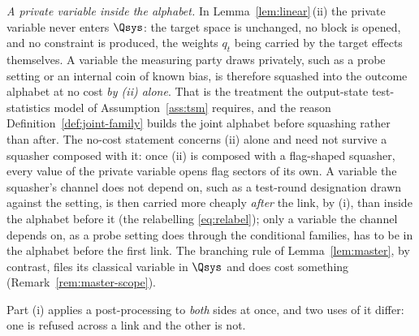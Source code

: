 \begin{remark}\label{rem:intertwining}
\emph{A private variable inside the alphabet.} In
Lemma~\ref{lem:linear}\,(ii) the private variable never enters $\Qsys$: the
target space is unchanged, no block is opened, and no constraint is produced,
the weights $q_t$ being carried by the target effects themselves. A variable
the measuring party draws privately, such as a probe setting or an internal coin of known
bias, is therefore squashed into the outcome alphabet at no cost \emph{by (ii)
alone}. That is the treatment the output-state test-statistics model of
Assumption~\ref{ass:tsm} requires, and the reason
Definition~\ref{def:joint-family} builds the joint alphabet before squashing
rather than after. The no-cost statement concerns (ii) alone and need not
survive a squasher composed with it: once (ii) is composed with a flag-shaped
squasher, every value of the private variable opens flag sectors of its own.
A variable the squasher's channel does not depend on, such as a test-round designation drawn against the setting, is
then carried more cheaply \emph{after} the link, by (i), than inside the
alphabet before it (the relabelling \eqref{eq:relabel}); only a
variable the channel depends on, as a probe setting does through the
conditional families, has to be in the alphabet before the first link. The
branching rule of Lemma~\ref{lem:master}, by contrast, files its classical
variable in $\Qsys$ and does cost something (Remark~\ref{rem:master-scope}).

Part (i) applies a post-processing to \emph{both} sides at once, and two uses
of it differ: one is refused across a link and the other is not.


\end{remark}
